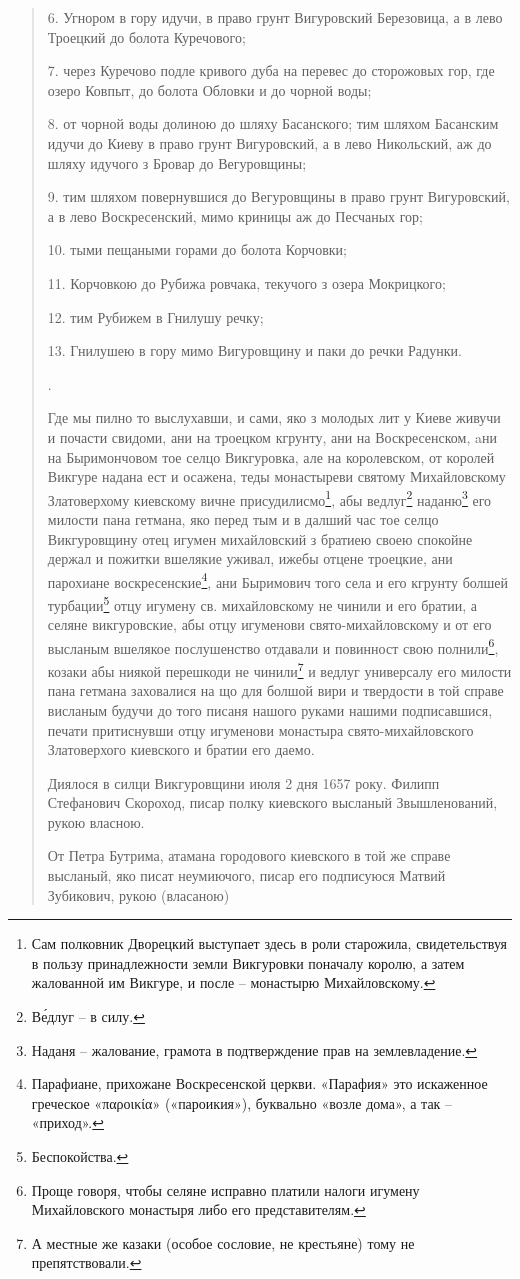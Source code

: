 \begin{quotation}
{6. Угнором в гору идучи, в право грунт Вигуровский Березовица, а в лево Троецкий до болота Куречового;

7. через Куречово подле кривого дуба на перевес до сторожовых гор, где озеро Ковпыт, до болота Обловки и до чорной воды;

8. от чорной воды долиною до шляху Басанского; тим шляхом Басанским идучи до Киеву в право грунт Вигуровский, а в лево Никольский, аж до шляху идучого з Бровар до Вегуровщины;

9. тим шляхом повернувшися до Вегуровщины в право грунт Вигуровский, а в лево Воскресенский, мимо криницы аж до Песчаных гор;

10. тыми пещаными горами до болота Корчовки;

11. Корчовкою до Рубижа ровчака, текучого з озера Мокрицкого;

12. тим Рубижем в Гнилушу речку;

13. Гнилушею в гору мимо Вигуровщину и паки до речки Радунки.}.

Где мы пилно то выслухавши, и сами, яко з молодых лит у Киеве живучи и почасти свидоми, ани на троецком кгрунту, ани на Воскресенском, aни на Быримончовом тое селцо Викгуровка, але на королевском, от королей Викгуре надана ест и осажена, теды монастыреви святому Михайловскому Златоверхому киевскому вичне присудилисмо\footnote{Сам полковник Дворецкий выступает здесь в роли старожила, свидетельствуя в пользу принадлежности земли Викгуровки поначалу королю, а затем жалованной им Викгуре, и после – монастырю Михайловскому.}, абы ведлуг\footnote{В\'едлуг – в силу.} наданю\footnote{Наданя – жалование, грамота в подтверждение прав на землевладение.} его милости пана гетмана, яко перед тым и в далший час тое селцо Викгуровщину отец игумен михайловский з братиею своею спокойне держал и пожитки вшелякие уживал, ижебы отцене троецкие, ани парохиане воскресенские\footnote{Парафиане, прихожане Воскресенской церкви. «Парафия» это искаженное греческое «παροικία» («пароикия»), буквально «возле дома», а так – «приход».}, ани Быримович того села и его кгрунту болшей турбации\footnote{Беспокойства.} отцу игумену св. михайловскому не чинили и его братии, а селяне викгуровские, абы отцу игуменови свято-михайловскому и от его высланым вшелякое послушенство отдавали и повинност свою полнили\footnote{Проще говоря, чтобы селяне исправно платили налоги игумену Михайловского монастыря либо его представителям.}, козаки абы ниякой перешкоди не чинили\footnote{А местные же казаки (особое сословие, не крестьяне) тому не препятствовали.} и ведлуг универсалу его милости пана гетмана заховалися на що для болшой вири и твердости в той справе висланым будучи до того писаня нашого руками нашими подписавшися, печати притиснувши отцу игуменови монастыра свято-михайловского Златоверхого киевского и братии его даемо.

Диялося в силци Викгуровщини июля 2 дня 1657 року. Филипп Стефанович Скороход, писар полку киевского высланый Звышленований, рукою власною.

От Петра Бутрима, атамана городового киевского в той же справе высланый, яко писат неумиючого, писар его подписуюся Матвий Зубикович, рукою (власаною)
\end{quotation}

